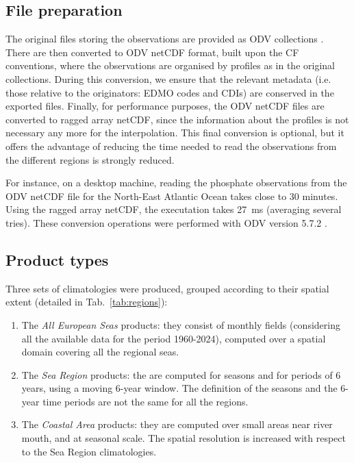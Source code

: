 \documentclass[essd, manuscript]{copernicus}
\begin{document}
\subsection{File preparation}

The original files storing the observations are provided as ODV collections \citep[Ocean Data View,][]{SCHLITZER2002}. There are then converted to ODV netCDF format, built upon the CF conventions, where the observations are organised by profiles as in the original collections. During this conversion, we ensure that the relevant metadata (i.e. those relative to the originators: EDMO codes and CDIs) are conserved in the exported files. Finally, for performance purposes, the ODV netCDF files are converted to ragged array netCDF, since the information about the profiles is not necessary any more for the interpolation. This final conversion is optional, but it offers the advantage of reducing the time needed to read the observations from the different regions is strongly reduced.

For instance, on a desktop machine, reading the phosphate observations from the ODV netCDF file for the North-East Atlantic Ocean takes close to 30 minutes. Using the ragged array netCDF, the executation takes 27~ms (averaging several tries). These conversion operations were performed with ODV version 5.7.2 \citep{Schlitzer2024}.

\subsection{Product types\label{sec:products}}

Three sets of climatologies were produced, grouped according to their spatial extent (detailed in Tab.~\ref{tab:regions}): 
\begin{enumerate}
\item The \textit{All European Seas} products: they consist of monthly fields (considering all the available data for the period 1960-2024), computed over a spatial domain covering all the regional seas.
\item The \textit{Sea Region} products: the are computed for seasons and for periods of 6 years, using a moving 6-year window. The definition of the seasons and the 6-year time periods are not the same for all the regions. 
\item The \textit{Coastal Area} products: they are computed over small areas near river mouth, and at seasonal scale. The spatial resolution is increased with respect to the Sea Region climatologies.
\end{enumerate}
\end{document}
